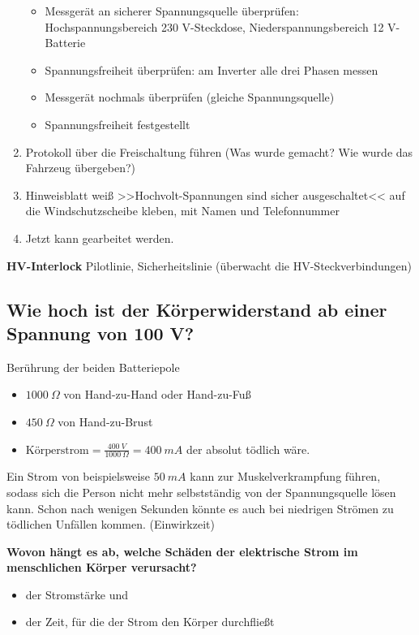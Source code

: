 \begin{enumerate}
  \begin{itemize}
  \item
    Messgerät an sicherer Spannungsquelle überprüfen:
    Hochspannungsbereich 230 V-Steckdose, Niederspannungsbereich 12
    V-Batterie
  \item
    Spannungsfreiheit überprüfen: am Inverter alle drei Phasen messen
  \item
    Messgerät nochmals überprüfen (gleiche Spannungsquelle)
  \item
    Spannungsfreiheit festgestellt
  \end{itemize}
\item
  Protokoll über die Freischaltung führen (Was wurde gemacht? Wie wurde
  das Fahrzeug übergeben?)
\item
  Hinweisblatt weiß >>Hochvolt-Spannungen sind sicher ausgeschaltet<<
  auf die Windschutzscheibe kleben, mit Namen und Telefonnummer
\item
  Jetzt kann gearbeitet werden.
\end{enumerate}

\textbf{HV-Interlock} Pilotlinie, Sicherheitslinie (überwacht die
HV-Steckverbindungen)

\subsection{Wie hoch ist der Körperwiderstand ab einer Spannung von 100
V?}\label{wie-hoch-ist-der-koerperwiderstand-ab-einer-spannung-von-100-v}

Berührung der beiden Batteriepole

\begin{itemize}
\item
  $1000~\Omega$ von Hand-zu-Hand oder Hand-zu-Fuß
\item
  $450~\Omega$ von Hand-zu-Brust
\item
  $\text{Körperstrom} = \frac{400~V}{1000~\Omega} = 400~mA$ der
  absolut tödlich wäre.
\end{itemize}

Ein Strom von beispielsweise $50~mA$ kann zur Muskelverkrampfung
führen, sodass sich die Person nicht mehr selbstständig von der
Spannungsquelle lösen kann. Schon nach wenigen Sekunden könnte es auch
bei niedrigen Strömen zu tödlichen Unfällen kommen. (Einwirkzeit)

\textbf{Wovon hängt es ab, welche Schäden der elektrische Strom im
menschlichen Körper verursacht?}

\begin{itemize}
\item
  der Stromstärke und
\item
  der Zeit, für die der Strom den Körper durchfließt
\end{itemize}

